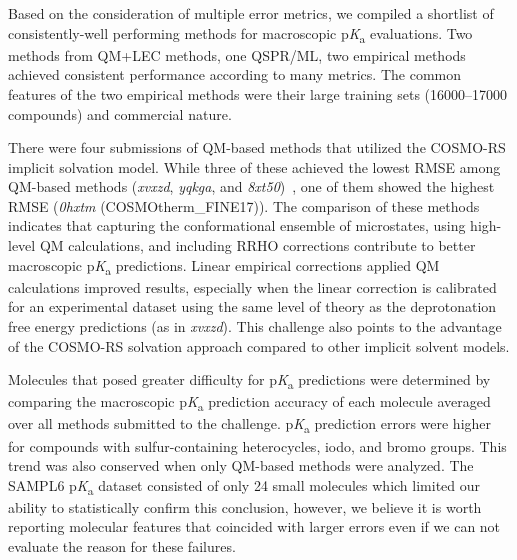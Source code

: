 \documentclass[9pt,lineno,final]{elife}
\newcommand{\pKa}{p\textit{K}\textsubscript{a}}
\begin{document}
Based on the consideration of multiple error metrics, we compiled a shortlist of consistently-well performing methods for macroscopic \pKa{} evaluations. 
Two methods from QM+LEC methods, one QSPR/ML, two empirical methods achieved consistent performance according to many metrics. 
The common features of the two empirical methods were their large training sets (16000--17000 compounds) and commercial nature.

There were four submissions of QM-based methods that utilized the COSMO-RS implicit solvation model. 
While three of these achieved the lowest RMSE among QM-based methods (\textit{xvxzd}, \textit{yqkga}, and \textit{8xt50})~\citep{Pracht:2018:J.Comput.AidedMol.Des.}, one of them showed the highest RMSE (\textit{0hxtm} (COSMOtherm\_FINE17)). 
The comparison of these methods indicates that capturing the conformational ensemble of microstates, using high-level QM calculations, and including RRHO corrections contribute to better macroscopic \pKa{} predictions.
Linear empirical corrections applied QM calculations improved results, especially when the linear correction is calibrated for an experimental dataset using the same level of theory as the deprotonation free energy predictions (as in \textit{xvxzd}).
This challenge also points to the advantage of the COSMO-RS solvation approach compared to other implicit solvent models.

Molecules that posed greater difficulty for \pKa{} predictions were determined by comparing the macroscopic \pKa{} prediction accuracy of each molecule averaged over all methods submitted to the challenge. 
\pKa{} prediction errors were higher for compounds with sulfur-containing heterocycles, iodo, and bromo groups. 
This trend was also conserved when only QM-based methods were analyzed. 
The SAMPL6 \pKa{} dataset consisted of only 24 small molecules which limited our ability to statistically confirm this conclusion, however, we believe it is worth reporting molecular features that coincided with larger errors even if we can not evaluate the reason for these failures. 
\end{document}

